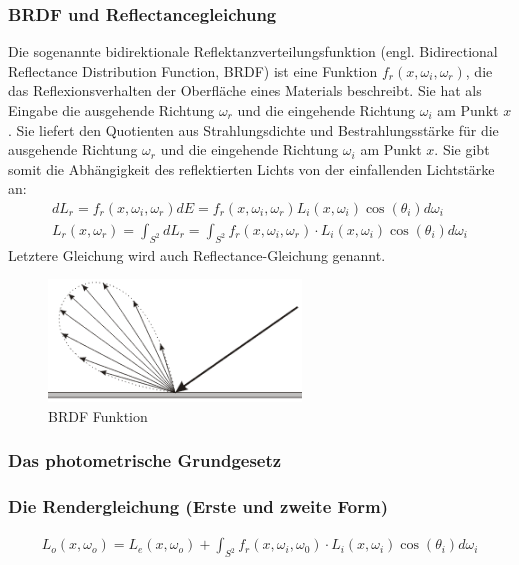 \subsubsection{BRDF und Reflectancegleichung }
Die sogenannte bidirektionale Reflektanzverteilungsfunktion (engl. Bidirectional Reflectance Distribution Function, BRDF)
ist eine Funktion $f_r (x, \omega_i, \omega_r)$, die das Reflexionsverhalten der Oberfläche eines Materials beschreibt. 
Sie hat als Eingabe die ausgehende Richtung $\omega_r$ und die eingehende Richtung  $\omega_i$ am Punkt $x$. 
Sie  liefert den Quotienten aus Strahlungsdichte und Bestrahlungsstärke für die ausgehende Richtung $\omega_r$ und die eingehende Richtung  $\omega_i$ am Punkt $x$.
Sie gibt somit die Abhängigkeit des reflektierten Lichts von der einfallenden Lichtstärke an: 
\begin{align}
dL_r = f_r(x, \omega_i, \omega_r) dE =   f_r(x, \omega_i, \omega_r) L_i(x,\omega_i) \cos(\theta_i) d \omega_i\\
L_r(x, \omega_r) = \int_{S^2} dL_r =    \int_{S^2}f_r (x, \omega_i, \omega_r) \cdot L_i(x, \omega_i) \cos(\theta_i) d\omega_i
\end{align}
Letztere Gleichung wird auch Reflectance-Gleichung genannt.
 \begin{figure}[H]
    \centering
    \includegraphics[width=0.6\textwidth]{images/brdf2.png}
    \caption{BRDF Funktion}
    \label{fig:raytracin_brdf}
\end{figure}

\subsubsection{Das photometrische Grundgesetz}
 
\subsubsection{Die Rendergleichung (Erste und zweite Form)}

\begin{align}
L_o(x, \omega_o) = L_e(x, \omega_o)  + \displaystyle \int_{S^2}f_r (x, \omega_i, \omega_0) \cdot L_i(x, \omega_i) \cos(\theta_i) d\omega_i
\end{align}

